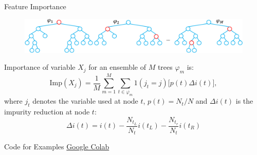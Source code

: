 \documentclass{beamer}
\begin{document}
\begin{frame}{Feature Importance\footnotemark}
\begin{figure}
	\includegraphics[scale=0.4]{mdi.pdf}
\end{figure}
Importance of variable $X_j$ for an ensemble of $M$ trees $\varphi_{m}$ is:
\begin{equation*}
\text{Imp}(X_j) = \frac{1}{M} \sum_{m=1}^M \sum_{t \in \varphi_{m}} 1(j_t = j) \Big[ p(t) \Delta i(t) \Big],
\end{equation*}
where $j_t$ denotes the variable used at node $t$, $p(t)=N_t/N$ and $\Delta i(t)$ is the impurity reduction at node $t$:
\begin{equation*}
\Delta i(t) = i(t) - \frac{N_{t_L}}{N_t} i(t_L) - \frac{N_{t_r}}{N_t} i(t_R)
\end{equation*}

\end{frame}


	\begin{frame}{Code for Examples}
		\centering
		\href{https://colab.research.google.com/drive/1Yix-Hn1zqT6o-wOQkoiBhjKklzhJgekF}{Google Colab}
	\end{frame}
\end{document}
